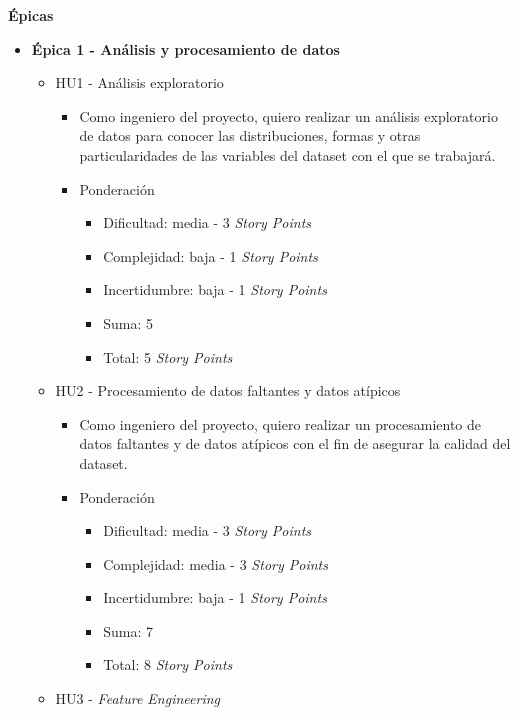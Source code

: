 \documentclass[
11pt, %
]{charter}
\begin{document}
\textbf{\'{E}picas}
\begin{itemize}
  \item \textbf{\'{E}pica 1 - Análisis y procesamiento de datos}
    \begin{itemize}
      \item HU1 - Análisis exploratorio
        \begin{itemize}
            \item Como ingeniero del proyecto, quiero realizar un análisis exploratorio de datos para conocer las distribuciones, formas y otras particularidades de las variables del dataset con el que se trabajará.
            \item Ponderación
            \begin{itemize}
                \item Dificultad: media - 3 \textit{Story Points}
                \item Complejidad: baja - 1 \textit{Story Points}
                \item Incertidumbre: baja - 1 \textit{Story Points}
                \item Suma: 5
                \item Total: 5 \textit{Story Points}
            \end{itemize}            
        \end{itemize}
      \item HU2 - Procesamiento de datos faltantes y datos atípicos
        \begin{itemize}
            \item Como ingeniero del proyecto, quiero realizar un procesamiento de datos faltantes y de datos atípicos con el fin de asegurar la calidad del dataset.
            \item Ponderación
            \begin{itemize}
                \item Dificultad: media - 3 \textit{Story Points}
                \item Complejidad: media - 3 \textit{Story Points}
                \item Incertidumbre: baja - 1 \textit{Story Points}
                \item Suma: 7
                \item Total: 8 \textit{Story Points}
            \end{itemize}
        \end{itemize}
\newpage
      \item HU3 - \textit{Feature Engineering}

\end{itemize}
\end{itemize}
\end{document}
